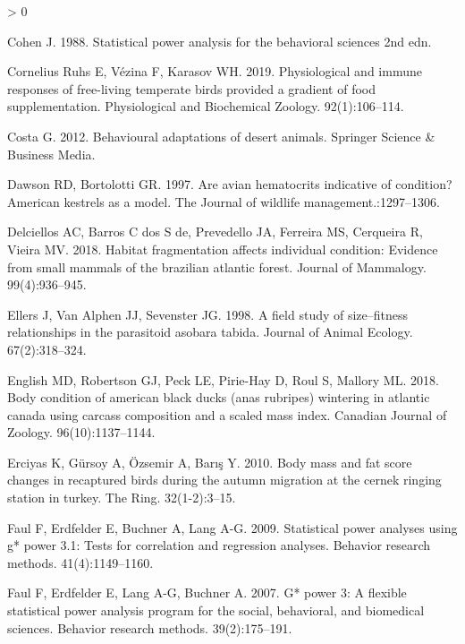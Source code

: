 \documentclass[
]{article}
\newlength{\cslhangindent}
\newenvironment{CSLReferences}[2] %
 {%
  \setlength{\parindent}{0pt}
  \ifodd #1 \everypar{\setlength{\hangindent}{\cslhangindent}}\ignorespaces\fi
  \ifnum #2 > 0
  \setlength{\parskip}{#2\baselineskip}
  \fi
 }%
 {}
\begin{document}
\begin{CSLReferences}{0}{0}
\leavevmode\hypertarget{ref-cohen1988statistical}{}%
Cohen J. 1988. Statistical power analysis for the behavioral sciences
2nd edn.

\leavevmode\hypertarget{ref-cornelius2019physiological}{}%
Cornelius Ruhs E, Vézina F, Karasov WH. 2019. Physiological and immune
responses of free-living temperate birds provided a gradient of food
supplementation. Physiological and Biochemical Zoology. 92(1):106--114.

\leavevmode\hypertarget{ref-costa2012behavioural}{}%
Costa G. 2012. Behavioural adaptations of desert animals. Springer
Science \& Business Media.

\leavevmode\hypertarget{ref-dawson1997avian}{}%
Dawson RD, Bortolotti GR. 1997. Are avian hematocrits indicative of
condition? American kestrels as a model. The Journal of wildlife
management.:1297--1306.

\leavevmode\hypertarget{ref-delciellos2018habitat}{}%
Delciellos AC, Barros C dos S de, Prevedello JA, Ferreira MS, Cerqueira
R, Vieira MV. 2018. Habitat fragmentation affects individual condition:
Evidence from small mammals of the brazilian atlantic forest. Journal of
Mammalogy. 99(4):936--945.

\leavevmode\hypertarget{ref-ellers1998field}{}%
Ellers J, Van Alphen JJ, Sevenster JG. 1998. A field study of
size--fitness relationships in the parasitoid asobara tabida. Journal of
Animal Ecology. 67(2):318--324.

\leavevmode\hypertarget{ref-english2018body}{}%
English MD, Robertson GJ, Peck LE, Pirie-Hay D, Roul S, Mallory ML.
2018. Body condition of american black ducks (anas rubripes) wintering
in atlantic canada using carcass composition and a scaled mass index.
Canadian Journal of Zoology. 96(10):1137--1144.

\leavevmode\hypertarget{ref-erciyas2010body}{}%
Erciyas K, Gürsoy A, Özsemir A, Barış Y. 2010. Body mass and fat score
changes in recaptured birds during the autumn migration at the cernek
ringing station in turkey. The Ring. 32(1-2):3--15.

\leavevmode\hypertarget{ref-faul2009statistical}{}%
Faul F, Erdfelder E, Buchner A, Lang A-G. 2009. Statistical power
analyses using g* power 3.1: Tests for correlation and regression
analyses. Behavior research methods. 41(4):1149--1160.

\leavevmode\hypertarget{ref-faul2007g}{}%
Faul F, Erdfelder E, Lang A-G, Buchner A. 2007. G* power 3: A flexible
statistical power analysis program for the social, behavioral, and
biomedical sciences. Behavior research methods. 39(2):175--191.


\end{CSLReferences}
\end{document}
